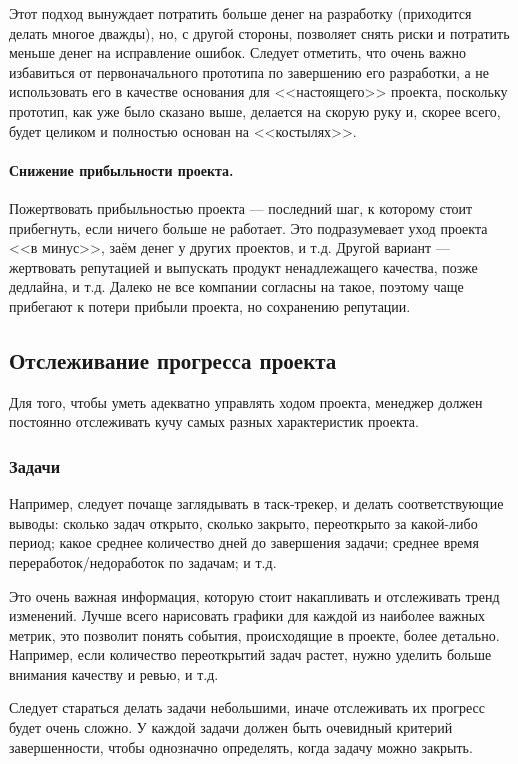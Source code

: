 \documentclass{../../text-style}
\begin{document}
Этот подход вынуждает потратить больше денег на разработку (приходится делать многое дважды), но, с другой стороны, позволяет снять риски и потратить меньше денег на исправление ошибок. Следует отметить, что очень важно избавиться от первоначального прототипа по завершению его разработки, а не использовать его в качестве основания для <<настоящего>> проекта, поскольку прототип, как уже было сказано выше, делается на скорую руку и, скорее всего, будет целиком и полностью основан на <<костылях>>.

\paragraph{Снижение прибыльности проекта.} Пожертвовать прибыльностью проекта --- последний шаг, к которому стоит прибегнуть, если ничего больше не работает. Это подразумевает уход проекта <<в минус>>, заём денег у других проектов, и т.д. Другой вариант --- жертвовать репутацией и выпускать продукт ненадлежащего качества, позже дедлайна, и т.д. Далеко не все компании согласны на такое, поэтому чаще прибегают к потери прибыли проекта, но сохранению репутации.

\subsection{Отслеживание прогресса проекта}

Для того, чтобы уметь адекватно управлять ходом проекта, менеджер должен постоянно отслеживать кучу самых разных характеристик проекта.

\subsubsection{Задачи}

Например, следует почаще заглядывать в таск-трекер, и делать соответствующие выводы: сколько задач открыто, сколько закрыто, переоткрыто за какой-либо период; какое среднее количество дней до завершения задачи; среднее время переработок/недоработок по задачам; и т.д.

Это очень важная информация, которую стоит накапливать и отслеживать тренд изменений. Лучше всего нарисовать графики для каждой из наиболее важных метрик, это позволит понять события, происходящие в проекте, более детально. Например, если количество переоткрытий задач растет, нужно уделить больше внимания качеству и ревью, и т.д. 

Следует стараться делать задачи небольшими, иначе отслеживать их прогресс будет очень сложно. У каждой задачи должен быть очевидный критерий завершенности, чтобы однозначно определять, когда задачу можно закрыть.
\end{document}
